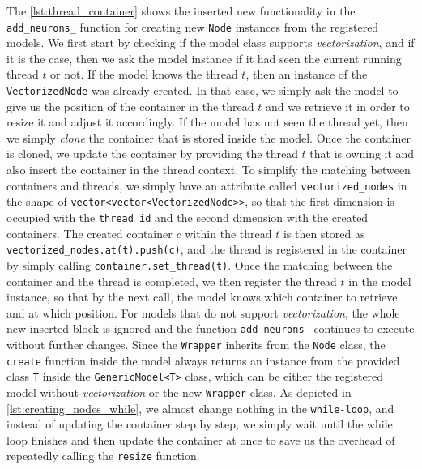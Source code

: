 The \autoref{lst:thread_container} shows the inserted new functionality in the \texttt{add\_neurons\_} function for creating new \texttt{Node} instances from the registered models. We first start by checking if the model class supports \emph{vectorization}, and if it is the case, then we ask the model instance if it had seen the current running thread $t$ or not. If the model knows the thread $t$, then an instance of the \texttt{VectorizedNode} was already created. In that case, we simply ask the model to give us the position of the container in the thread $t$ and we retrieve it in order to resize it and adjust it accordingly. If the model has not seen the thread yet, then we simply \emph{clone} the container that is stored inside the model. Once the container is cloned, we update the container by providing  the thread $t$ that is owning it and also insert the container in the thread context. To simplify the matching between containers and threads, we simply have an attribute called \texttt{vectorized\_nodes} in the shape of \texttt{vector<vector<VectorizedNode>>}, so that the first dimension is occupied with the \texttt{thread\_id} and the second dimension with the created containers. The created container $c$ within the thread $t$ is then stored as \texttt{vectorized\_nodes.at(t).push(c)}, and the thread is registered in the container by simply calling \texttt{container.set\_thread(t)}. Once the matching between the container and the thread is completed, we then register the thread $t$ in the model instance, so that by the next call, the model knows which container to retrieve and at which position.  For models that do not support \emph{vectorization}, the whole new inserted block is ignored and the function \texttt{add\_neurons\_}  continues to execute without further changes. Since the \texttt{Wrapper} inherits from the \texttt{Node} class, the \texttt{create} function inside the model always returns an instance from the provided class \texttt{T} inside the \texttt{GenericModel<T>} class, which can be either the registered model without \emph{vectorization} or the new \texttt{Wrapper} class. As depicted in \autoref{lst:creating_nodes_while}, we almost change nothing in the \texttt{while-loop}, and instead of updating the container step by step, we simply wait until the while loop finishes and then update the container at once to save us the overhead of repeatedly calling the \texttt{resize} function.\\


